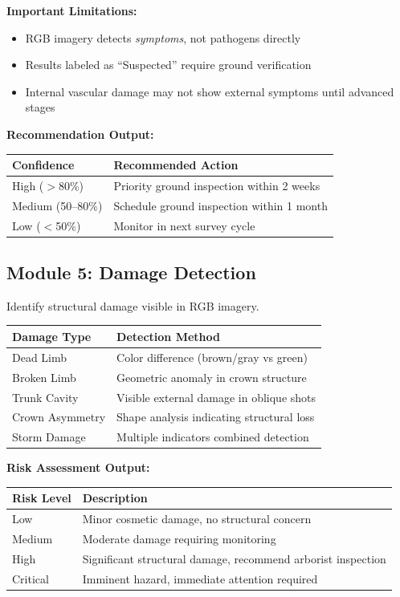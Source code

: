 \documentclass[11pt,a4paper]{article}
\begin{document}
\textbf{Important Limitations:}
\begin{itemize}[leftmargin=*]
\item RGB imagery detects \textit{symptoms}, not pathogens directly
\item Results labeled as ``Suspected'' require ground verification
\item Internal vascular damage may not show external symptoms until advanced stages
\end{itemize}

\textbf{Recommendation Output:}
\begin{center}
\begin{tabular}{ll}
\toprule
\textbf{Confidence} & \textbf{Recommended Action} \\
\midrule
High ($>$80\%) & Priority ground inspection within 2 weeks \\
Medium (50--80\%) & Schedule ground inspection within 1 month \\
Low ($<$50\%) & Monitor in next survey cycle \\
\bottomrule
\end{tabular}
\end{center}

\subsection{Module 5: Damage Detection}

Identify structural damage visible in RGB imagery.

\begin{center}
\begin{tabular}{ll}
\toprule
\textbf{Damage Type} & \textbf{Detection Method} \\
\midrule
Dead Limb & Color difference (brown/gray vs green) \\
Broken Limb & Geometric anomaly in crown structure \\
Trunk Cavity & Visible external damage in oblique shots \\
Crown Asymmetry & Shape analysis indicating structural loss \\
Storm Damage & Multiple indicators combined detection \\
\bottomrule
\end{tabular}
\end{center}

\textbf{Risk Assessment Output:}
\begin{center}
\begin{tabular}{lp{8cm}}
\toprule
\textbf{Risk Level} & \textbf{Description} \\
\midrule
Low & Minor cosmetic damage, no structural concern \\
Medium & Moderate damage requiring monitoring \\
High & Significant structural damage, recommend arborist inspection \\
Critical & Imminent hazard, immediate attention required \\
\bottomrule
\end{tabular}
\end{center}
\end{document}
